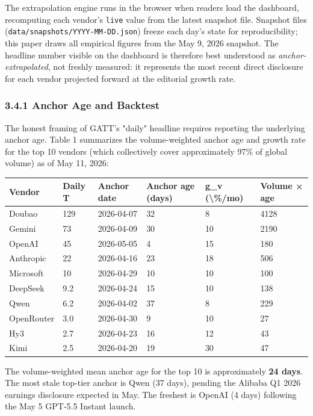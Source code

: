 \documentclass[11pt,a4paper]{article}
\begin{document}
The extrapolation engine runs in the browser when readers load the dashboard, recomputing each vendor's \texttt{live} value from the latest snapshot file. Snapshot files (\texttt{data/snapshots/YYYY-MM-DD.json}) freeze each day's state for reproducibility; this paper draws all empirical figures from the May 9, 2026 snapshot. The headline number visible on the dashboard is therefore best understood as \emph{anchor-extrapolated}, not freshly measured: it represents the most recent direct disclosure for each vendor projected forward at the editorial growth rate.

\subsubsection{3.4.1 Anchor Age and Backtest}

The honest framing of GATT's "daily" headline requires reporting the underlying anchor age. Table 1 summarizes the volume-weighted anchor age and growth rate for the top 10 vendors (which collectively cover approximately 97\% of global volume) as of May 11, 2026:

\begin{center}
\begin{tabular}{llllll}
\toprule
Vendor & Daily T & Anchor date & Anchor age (days) & g\_v (\textbackslash{}\%/mo) & Volume × age \\
\midrule
Doubao & 129 & 2026-04-07 & 32 & 8 & 4128 \\
Gemini & 73 & 2026-04-09 & 30 & 10 & 2190 \\
OpenAI & 45 & 2026-05-05 & 4 & 15 & 180 \\
Anthropic & 22 & 2026-04-16 & 23 & 18 & 506 \\
Microsoft & 10 & 2026-04-29 & 10 & 10 & 100 \\
DeepSeek & 9.2 & 2026-04-24 & 15 & 10 & 138 \\
Qwen & 6.2 & 2026-04-02 & 37 & 8 & 229 \\
OpenRouter & 3.0 & 2026-04-30 & 9 & 10 & 27 \\
Hy3 & 2.7 & 2026-04-23 & 16 & 12 & 43 \\
Kimi & 2.5 & 2026-04-20 & 19 & 30 & 47 \\
\bottomrule
\end{tabular}
\end{center}


The volume-weighted mean anchor age for the top 10 is approximately \textbf{24 days}. The most stale top-tier anchor is Qwen (37 days), pending the Alibaba Q1 2026 earnings disclosure expected in May. The freshest is OpenAI (4 days) following the May 5 GPT-5.5 Instant launch.
\end{document}
